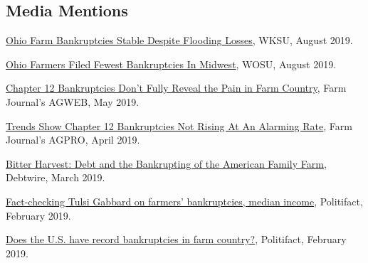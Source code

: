 \documentclass[letterpaper]{article}
\renewenvironment{itemize}{
  \begin{list}{}{
    \setlength{\leftmargin}{1.5em}
  }
}{
  \end{list}
}
\begin{document}
\subsection*{Media Mentions}

\begin{itemize}

\item \href{https://www.wksu.org/post/ohio-farm-bankruptcies-stable-despite-flooding-losses#stream/0}{Ohio Farm Bankruptcies Stable Despite Flooding Losses}, WKSU, August 2019.
\item \href{https://radio.wosu.org/post/ohio-farmers-filed-fewest-bankruptcies-midwest#stream/0}{Ohio Farmers Filed Fewest Bankruptcies In Midwest}, WOSU, August 2019.
\item \href{https://www.agweb.com/article/chapter-12-bankruptcies-dont-fully-reveal-the-pain-in-farm-country/}{Chapter 12 Bankruptcies Don't Fully Reveal the Pain in Farm Country}, Farm Journal's AGWEB, May 2019.
\item \href{https://www.agprofessional.com/article/trends-show-chapter-12-bankruptcies-not-rising-alarming-rate}{Trends Show Chapter 12 Bankruptcies Not Rising At An Alarming Rate}, Farm Journal's AGPRO, April 2019.
\item \href{http://investigations.debtwire.com/bitter-harvest-debt-and-the-bankrupting-of-the-american-family-farm/}{Bitter Harvest: Debt and the Bankrupting of the American Family Farm}, Debtwire, March 2019.
\item \href{https://www.politifact.com/truth-o-meter/statements/2019/feb/27/tulsi-gabbard/tulsi-gabbard/}{Fact-checking Tulsi Gabbard on farmers' bankruptcies, median income}, Politifact, February 2019.
\item \href{https://www.politifact.com/punditfact/statements/2019/feb/26/heidi-heitkamp/does-us-have-record-bankruptcies-farm-country/}{Does the U.S. have record bankruptcies in farm country?}, Politifact, February 2019.


\end{itemize}
\end{document}

